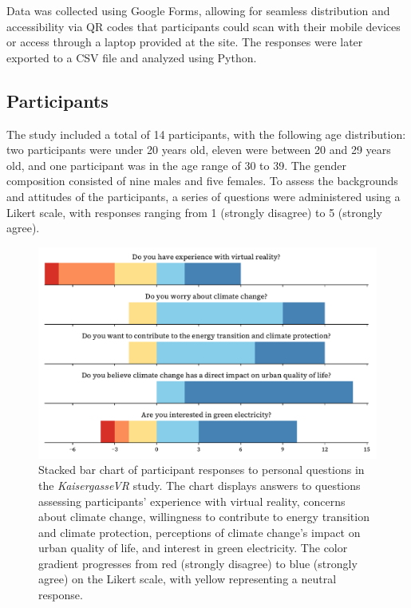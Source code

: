 \documentclass[draft, final]{vutinfth} %
\begin{document}
Data was collected using Google Forms, allowing for seamless distribution and accessibility via QR codes that participants could scan with their mobile devices or access through a laptop provided at the site. The responses were later exported to a CSV file and analyzed using Python.

\subsection{Participants}

The study included a total of 14 participants, with the following age distribution: two participants were under 20 years old, eleven were between 20 and 29 years old, and one participant was in the age range of 30 to 39. The gender composition consisted of nine males and five females. To assess the backgrounds and attitudes of the participants, a series of questions were administered using a Likert scale, with responses ranging from 1 (strongly disagree) to 5 (strongly agree).

\begin{figure}[h]
    \centering
    \includegraphics[width=\textwidth]{graphics/participants-kaisergasse.pdf}
    \caption{Stacked bar chart of participant responses to personal questions in the \textit{KaisergasseVR} study. The chart displays answers to questions assessing participants' experience with virtual reality, concerns about climate change, willingness to contribute to energy transition and climate protection, perceptions of climate change's impact on urban quality of life, and interest in green electricity. The color gradient progresses from red (strongly disagree) to blue (strongly agree) on the Likert scale, with yellow representing a neutral response.}
    \label{fig:participants_kaisergasse}
\end{figure}
\end{document}
